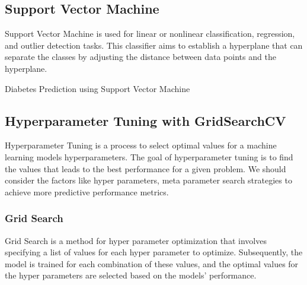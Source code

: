 \subsection{Support Vector Machine}
Support Vector Machine is used for linear or nonlinear classification, regression, and outlier detection tasks. This classifier aims to establish a hyperplane that can separate the classes by adjusting the distance between data points and the hyperplane. 
\begin{algorithm}
    \caption{Diabetes Prediction using Support Vector Machine}
    \label{algo:algo_svm}
    \begin{algorithmic}[1]
        \Statex
    \end{algorithmic}
\end{algorithm}

\subsection{Hyperparameter Tuning with GridSearchCV}
Hyperparameter Tuning is a process to select optimal values for a machine learning models hyperparameters. The goal of hyperparameter tuning is to find the values that leads to the best performance for a given problem. We should consider the factors like hyper parameters, meta parameter search strategies to achieve more predictive performance metrics.

\subsubsection{Grid Search}
Grid Search is a method for hyper parameter optimization that involves specifying a list of values for each hyper parameter to optimize. Subsequently, the model is trained for each combination of these values, and the optimal values for the hyper parameters are selected based on the models' performance.

